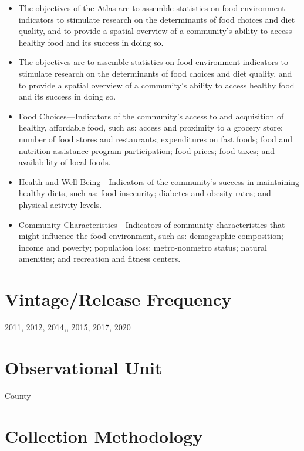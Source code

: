 \documentclass[
]{book}
\providecommand{\tightlist}{%
  \setlength{\itemsep}{0pt}\setlength{\parskip}{0pt}}
\begin{document}
\begin{itemize}
\tightlist
\item
  The objectives of the Atlas are to assemble statistics on food environment indicators to stimulate research on the determinants of food choices and diet quality, and to provide a spatial overview of a community's ability to access healthy food and its success in doing so.
\item
  The objectives are to assemble statistics on food environment indicators to stimulate research on the determinants of food choices and diet quality, and to provide a spatial overview of a community's ability to access healthy food and its success in doing so.
\item
  Food Choices---Indicators of the community's access to and acquisition of healthy, affordable food, such as: access and proximity to a grocery store; number of food stores and restaurants; expenditures on fast foods; food and nutrition assistance program participation; food prices; food taxes; and availability of local foods.
\item
  Health and Well-Being---Indicators of the community's success in maintaining healthy diets, such as: food insecurity; diabetes and obesity rates; and physical activity levels.
\item
  Community Characteristics---Indicators of community characteristics that might influence the food environment, such as: demographic composition; income and poverty; population loss; metro-nonmetro status; natural amenities; and recreation and fitness centers.
\end{itemize}

\hypertarget{vintagerelease-frequency-27}{%
\section{Vintage/Release Frequency}\label{vintagerelease-frequency-27}}

2011, 2012, 2014,, 2015, 2017, 2020

\hypertarget{observational-unit-27}{%
\section{Observational Unit}\label{observational-unit-27}}

County

\hypertarget{collection-methodology-27}{%
\section{Collection Methodology}\label{collection-methodology-27}}
\end{document}
